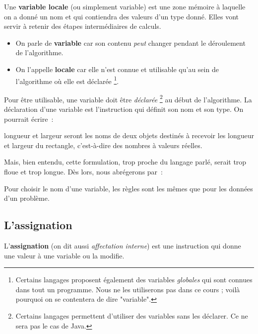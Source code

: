			Une \textbf{variable locale} (ou simplement variable)
			est une zone mémoire à laquelle on a donné un nom
			et qui contiendra des valeurs d'un type donné.
			Elles vont servir à retenir des étapes intermédiaires
			de calculs.
			\begin{itemize}
			\item
				On parle de \textbf{variable}
				car son contenu \emph{peut} changer
				pendant le déroulement de l'algorithme.
			\item
				On l'appelle \textbf{locale}
				car elle n'est connue et utilisable qu'au sein
				de l'algorithme où elle est déclarée%
				\footnote{%
					Certains langages proposent également des variables
					\emph{globales} qui sont connues dans tout un programme.
					Nous ne les utiliserons pas dans ce cours ;
					voilà pourquoi on se contentera de dire "variable".%
				}.
			\end{itemize}		
			Pour être utilisable, 
			une variable doit être \emph{déclarée}%
			\footnote{%
				Certains langages permettent 
				d'utiliser des variables sans les déclarer.
				Ce ne sera pas le cas de Java.
			}
			au début de l'algorithme. 	
			La déclaration d’une variable 
			est l’instruction qui définit son nom et son type. 
			On pourrait écrire~:
	
			\begin{LDA}
				\Stmt longueur et largeur seront les noms de deux objets destinés à recevoir
				\Stmt les longueur et largeur du rectangle, c’est-à-dire des nombres à valeurs réelles.
			\end{LDA}
			
			Mais, bien entendu, cette formulation, trop proche du
			langage parlé, serait trop floue et trop longue. 
			Dès lors, nous abrégerons par~:
	
			\begin{LDA}
				\Decl{longueur, largeur}{réels}
			\end{LDA}
			
			Pour choisir le nom d'une variable,
			les règles sont les mêmes que pour les données d'un problème.
	
		\subsection{L'assignation}
	
			L'\textbf{assignation} 
			(on dit aussi \emph{affectation interne})
			est une instruction qui donne une valeur 
			à une variable ou la modifie.
	
